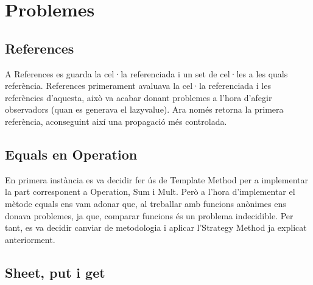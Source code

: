 \documentclass{article}
\begin{document}
	\section{Problemes}
	\subsection{References}%
	A References es guarda la cel·la referenciada i un set de cel·les a les quals referència.
	References primerament avaluava la cel·la referenciada i les referències d'aquesta,
	això va acabar donant problemes a l'hora d'afegir observadors (quan es generava el lazyvalue).
	Ara només retorna la primera referència, aconseguint així una propagació més controlada.

	\subsection{Equals en Operation}%
En primera instància es va decidir fer ús de Template Method per a implementar la part corresponent a Operation, Sum i Mult. Però a l'hora d'implementar el mètode equals ens vam adonar que, al treballar amb funcions anònimes ens donava problemes, ja que, comparar funcions és un problema indecidible. Per tant, es va decidir canviar de metodologia i aplicar l'Strategy Method ja explicat anteriorment.
	\subsection{Sheet, put i get}%
	
\end{document}
